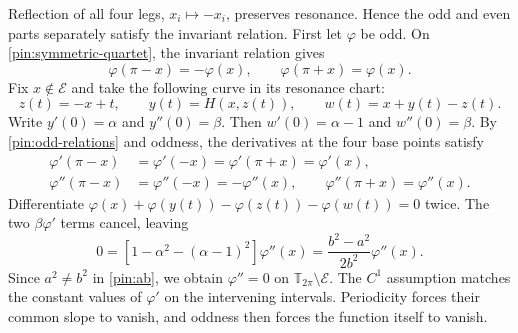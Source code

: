 Reflection of all four legs, $x_i\mapsto-x_i$, preserves resonance.
Hence the odd and even parts separately satisfy the invariant relation.
First let $\varphi$ be odd. On \eqref{pin:symmetric-quartet}, the
invariant relation gives
\begin{equation}
                  \varphi(\pi-x)=-\varphi(x),\qquad
                  \varphi(\pi+x)=\varphi(x).
 \label{pin:odd-relations}
\end{equation}
Fix $x\notin\mathcal E$ and take the following curve in its resonance
chart:
\begin{equation}
 z(t)=-x+t,\qquad y(t)=H(x,z(t)),\qquad
 w(t)=x+y(t)-z(t).
 \label{pin:transverse-curve}
\end{equation}
Write $y'(0)=\alpha$ and $y''(0)=\beta$. Then
$w'(0)=\alpha-1$ and $w''(0)=\beta$. By
\eqref{pin:odd-relations} and oddness, the derivatives at the four
base points satisfy
\begin{align*}
 \varphi'(\pi-x)&=\varphi'(-x)=\varphi'(\pi+x)=\varphi'(x),\\
 \varphi''(\pi-x)&=\varphi''(-x)=-\varphi''(x),\qquad
 \varphi''(\pi+x)=\varphi''(x).
\end{align*}
Differentiate
$\varphi(x)+\varphi(y(t))-\varphi(z(t))-\varphi(w(t))=0$
twice. The two $\beta\varphi'$ terms cancel, leaving
\begin{equation}
 0=[1-\alpha^2-(\alpha-1)^2]\varphi''(x)
   =\frac{b^2-a^2}{2b^2}\varphi''(x).
 \label{pin:odd-second}
\end{equation}
Since $a^2\ne b^2$ in \eqref{pin:ab}, we obtain $\varphi''=0$ on
$\mathbb T_{2\pi}\setminus\mathcal E$. The $C^1$ assumption matches
the constant values of $\varphi'$ on the intervening intervals.
Periodicity forces their common slope to vanish, and oddness then
forces the function itself to vanish.

